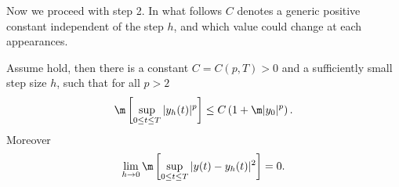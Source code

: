 
	Now we proceed with step 2. In what follows $C$ denotes a generic positive constant independent of the step $h$, and
which value could change at each appearances.
\begin{lem}\label{lem:BoundAndConvergenceOfyh}
	Assume  hold, then there is a constant $C=C(p,T)>0$ and a sufficiently small
	step size $h$, such that for all $p>2$
	\begin{equation}\label{eqn:yh-MomentBounds}
		\m\left[
			\sup_{0\leq t \leq T}
				|y_h(t)|^p
		\right]
		\leq
			C
		\left( 
			1+\m |y_0|^p
		\right).
	\end{equation}
	Moreover
	\begin{equation}\label{eqn:yh-convergence}
	\lim_{h \to 0}
	\m\left[
	\sup_{0\leq t \leq T}
	|y(t)-y_h(t)|^2
	\right]=0.
	\end{equation}
\end{lem}
